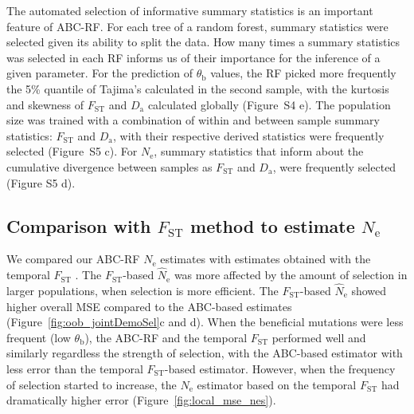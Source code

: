 \documentclass[a4paper, 12pt]{article}
\begin{document}
The automated selection of informative summary statistics is an important feature of ABC-RF. For each tree of a random forest, summary statistics were selected given its ability to split the data. How many times a summary statistics was selected in each RF informs us of their importance for the inference of a given parameter. For the prediction of $\theta_{\mathrm{b}}$ values, the RF picked more frequently the 5\% quantile of Tajima's calculated in the second sample, with the kurtosis and skewness of $F_{\mathrm{ST}}$ and $D_{\mathrm{a}}$ calculated globally (Figure~S4 e). The population size was trained with a combination of within and between sample summary statistics: $F_{\mathrm{ST}}$ and $D_{\mathrm{a}}$, with their respective derived statistics were frequently selected (Figure~S5 c). For $N_{\mathrm{e}}$, summary statistics that inform about the cumulative divergence between samples as $F_{\mathrm{ST}}$ and $D_{\mathrm{a}}$, were frequently selected (Figure S5 d).

\subsection*{Comparison with $F_{\mathrm{ST}}$ method to estimate $N_\mathrm{e}$}

We compared our ABC-RF $N_\mathrm{e}$ estimates with estimates obtained with the temporal $F_\mathrm{ST}$ \citep{Frachon:2017fw}. The $F_{\mathrm{ST}}$-based $\hat N_\mathrm{e}$ was more affected by the amount of selection in larger populations, when selection is more efficient. The $F_{\mathrm{ST}}$-based $\hat N_\mathrm{e}$ showed higher overall MSE compared to the ABC-based estimates (Figure~\ref{fig:oob_jointDemoSel}c and d). When the beneficial mutations were less frequent (low $\theta_{\mathrm{b}}$), the ABC-RF and the temporal $F_{\mathrm{ST}}$ performed well and similarly regardless the strength of selection, with the ABC-based estimator with less error than the temporal $F_{\mathrm{ST}}$-based estimator. However, when the frequency of selection started to increase, the $N_{\mathrm{e}}$ estimator based on the temporal $F_{\mathrm{ST}}$ had dramatically higher error (Figure~\ref{fig:local_mse_nes}).
\end{document}
